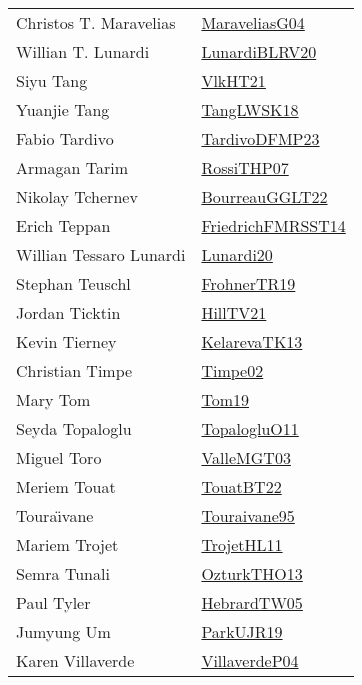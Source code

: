 {\begin{longtable}{p{4cm}p{20cm}}
Christos T. Maravelias & \href{papers/MaraveliasG04.pdf}{MaraveliasG04}\cite{MaraveliasG04} \\
Willian T. Lunardi & \href{articles/LunardiBLRV20.pdf}{LunardiBLRV20}\cite{LunardiBLRV20} \\
Siyu Tang & \href{articles/VlkHT21.pdf}{VlkHT21}\cite{VlkHT21} \\
Yuanjie Tang & \href{}{TangLWSK18}\cite{TangLWSK18} \\
Fabio Tardivo & \href{papers/TardivoDFMP23.pdf}{TardivoDFMP23}\cite{TardivoDFMP23} \\
Armagan Tarim & \href{papers/RossiTHP07.pdf}{RossiTHP07}\cite{RossiTHP07} \\
Nikolay Tchernev & \href{}{BourreauGGLT22}\cite{BourreauGGLT22} \\
Erich Teppan & \href{}{FriedrichFMRSST14}\cite{FriedrichFMRSST14} \\
Willian Tessaro Lunardi & \href{}{Lunardi20}\cite{Lunardi20} \\
Stephan Teuschl & \href{papers/FrohnerTR19.pdf}{FrohnerTR19}\cite{FrohnerTR19} \\
Jordan Ticktin & \href{papers/HillTV21.pdf}{HillTV21}\cite{HillTV21} \\
Kevin Tierney & \href{papers/KelarevaTK13.pdf}{KelarevaTK13}\cite{KelarevaTK13} \\
Christian Timpe & \href{articles/Timpe02.pdf}{Timpe02}\cite{Timpe02} \\
Mary Tom & \href{papers/Tom19.pdf}{Tom19}\cite{Tom19} \\
Seyda Topaloglu & \href{articles/TopalogluO11.pdf}{TopalogluO11}\cite{TopalogluO11} \\
Miguel Toro & \href{papers/ValleMGT03.pdf}{ValleMGT03}\cite{ValleMGT03} \\
Meriem Touat & \href{}{TouatBT22}\cite{TouatBT22} \\
Toura{\"{\i}}vane & \href{papers/Touraivane95.pdf}{Touraivane95}\cite{Touraivane95} \\
Mariem Trojet & \href{articles/TrojetHL11.pdf}{TrojetHL11}\cite{TrojetHL11} \\
Semra Tunali & \href{articles/OzturkTHO13.pdf}{OzturkTHO13}\cite{OzturkTHO13} \\
Paul Tyler & \href{papers/HebrardTW05.pdf}{HebrardTW05}\cite{HebrardTW05} \\
Jumyung Um & \href{papers/ParkUJR19.pdf}{ParkUJR19}\cite{ParkUJR19} \\
Karen Villaverde & \href{}{VillaverdeP04}\cite{VillaverdeP04} \\

\end{longtable}}
